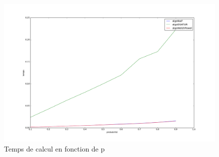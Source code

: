 \documentclass[a4paper,10pt]{report}
\begin{document}
\begin{center}
  \begin{figure}[h]
    \label{time}
    \includegraphics[scale=0.3]{temps.png}
    \caption{Temps de calcul en fonction de p}
  \end{figure} 
\end{center}
\end{document}
